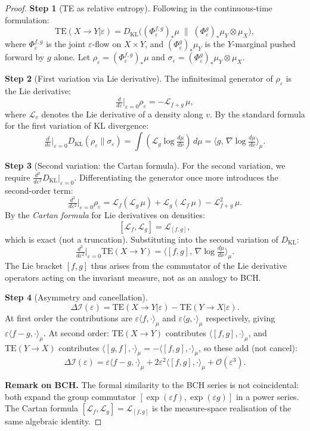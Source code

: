 \documentclass[11pt,a4paper]{article}
\theoremstyle{plain}
\theoremstyle{definition}
\theoremstyle{remark}
\newcommand{\DI}{\Delta\mathcal{I}}
\newcommand{\TE}{\mathrm{TE}}
\begin{document}
\begin{proof}
\textbf{Step 1} (TE as relative entropy).
Following \cite{Schreiber2000} in the continuous-time formulation:
\[
  \TE(X{\to}Y|\varepsilon) = D_{\mathrm{KL}}\!\bigl((\Phi^{f,g}_\varepsilon)_*\mu \;\big\|\; (\Phi^g_\varepsilon)_*\mu_Y \otimes \mu_X\bigr),
\]
where $\Phi^{f,g}_\varepsilon$ is the joint $\varepsilon$-flow on $X\times Y$,
and $(\Phi^g_\varepsilon)_*\mu_Y$ is the $Y$-marginal pushed forward by $g$ alone.
Let $\rho_\varepsilon = (\Phi^{f,g}_\varepsilon)_*\mu$ and $\sigma_\varepsilon = (\Phi^g_\varepsilon)_*\mu_Y\otimes\mu_X$.

\textbf{Step 2} (First variation via Lie derivative).
The infinitesimal generator of $\rho_\varepsilon$ is the Lie derivative:
\[
  \tfrac{d}{d\varepsilon}\big|_{\varepsilon=0} \rho_\varepsilon = -\mathcal{L}_{f+g}\,\mu,
\]
where $\mathcal{L}_v$ denotes the Lie derivative of a density along $v$.
By the standard formula for the first variation of KL divergence:
\[
  \tfrac{d}{d\varepsilon}\big|_{\varepsilon=0} D_{\mathrm{KL}}(\rho_\varepsilon\|\sigma_\varepsilon)
  = \int (\mathcal{L}_g \log \tfrac{d\mu}{d\nu})\,d\mu
  = \langle g,\,\nabla\log\tfrac{d\mu}{d\nu}\rangle_\mu.
\]

\textbf{Step 3} (Second variation: the Cartan formula).
For the second variation, we require $\frac{d^2}{d\varepsilon^2}D_{\mathrm{KL}}|_{\varepsilon=0}$.
Differentiating the generator once more introduces the second-order term:
\[
  \tfrac{d^2}{d\varepsilon^2}\big|_{\varepsilon=0} \rho_\varepsilon
  = \mathcal{L}_f(\mathcal{L}_g\,\mu) + \mathcal{L}_g(\mathcal{L}_f\,\mu) - \mathcal{L}_{f+g}^2\,\mu.
\]
By the \emph{Cartan formula} for Lie derivatives on densities:
\[
  [\mathcal{L}_f, \mathcal{L}_g] = \mathcal{L}_{[f,g]},
\]
which is exact (not a truncation).  Substituting into the second variation of $D_{\mathrm{KL}}$:
\[
  \tfrac{d^2}{d\varepsilon^2}\big|_{\varepsilon=0} \TE(X{\to}Y)
  = \langle [f,g],\,\nabla\log\tfrac{d\mu}{d\nu}\rangle_\mu.
\]
The Lie bracket $[f,g]$ thus arises from the commutator of the Lie derivative operators
acting on the invariant measure, not as an analogy to BCH.

\textbf{Step 4} (Asymmetry and cancellation).
\[
  \DI(\varepsilon) = \TE(X{\to}Y|\varepsilon) - \TE(Y{\to}X|\varepsilon).
\]
At first order the contributions are $\varepsilon\langle f,\cdot\rangle_\mu$ and
$\varepsilon\langle g,\cdot\rangle_\mu$ respectively, giving $\varepsilon\langle f-g,\cdot\rangle_\mu$.
At second order: $\TE(X{\to}Y)$ contributes $\langle[f,g],\cdot\rangle_\mu$, and
$\TE(Y{\to}X)$ contributes $\langle[g,f],\cdot\rangle_\mu = -\langle[f,g],\cdot\rangle_\mu$,
so these add (not cancel):
\[
  \DI(\varepsilon) = \varepsilon\langle f-g,\cdot\rangle_\mu
                   + 2\varepsilon^2\langle[f,g],\cdot\rangle_\mu + \mathcal{O}(\varepsilon^3).
\]

\textbf{Remark on BCH.}  The formal similarity to the BCH series is not coincidental:
both expand the group commutator $[\exp(\varepsilon f),\exp(\varepsilon g)]$ in a power series.
The Cartan formula $[\mathcal{L}_f,\mathcal{L}_g]=\mathcal{L}_{[f,g]}$ is the
measure-space realisation of the same algebraic identity.
\end{proof}
\end{document}
